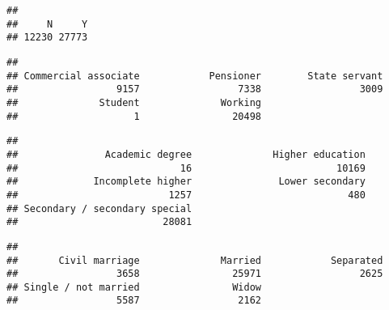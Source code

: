\documentclass[
]{article}
\newenvironment{Shaded}{\begin{snugshade}}{\end{snugshade}}
\newcommand{\FunctionTok}[1]{\textcolor[rgb]{0.00,0.00,0.00}{#1}}
\newcommand{\NormalTok}[1]{#1}
\newcommand{\SpecialCharTok}[1]{\textcolor[rgb]{0.00,0.00,0.00}{#1}}
\begin{document}
\begin{Shaded}
\end{Shaded}

\begin{verbatim}
## 
##     N     Y 
## 12230 27773
\end{verbatim}

\begin{Shaded}
\end{Shaded}

\begin{verbatim}
## 
## Commercial associate            Pensioner        State servant 
##                 9157                 7338                 3009 
##              Student              Working 
##                    1                20498
\end{verbatim}

\begin{Shaded}
\end{Shaded}

\begin{verbatim}
## 
##               Academic degree              Higher education 
##                            16                         10169 
##             Incomplete higher               Lower secondary 
##                          1257                           480 
## Secondary / secondary special 
##                         28081
\end{verbatim}

\begin{Shaded}
\end{Shaded}

\begin{verbatim}
## 
##       Civil marriage              Married            Separated 
##                 3658                25971                 2625 
## Single / not married                Widow 
##                 5587                 2162
\end{verbatim}
\end{document}
